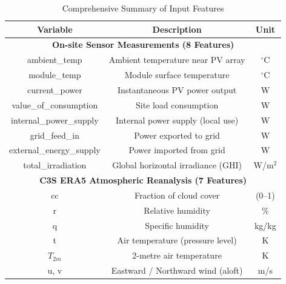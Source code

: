\documentclass[conference]{IEEEtran}
\begin{document}
	\begin{table}[!hb]
		\centering
		\caption{Comprehensive Summary of Input Features}
		\label{tab:comprehensive_features}
		\setlength{\tabcolsep}{1pt}
		\begin{tabular}{|c|c|c|}
			\hline
			\textbf{Variable} & \textbf{Description} & \textbf{Unit} \\ \hline
			
			\multicolumn{3}{|c|}{\textbf{On-site Sensor Measurements (8 Features)}} \\ \hline
			ambient\_temp            & Ambient temperature near PV array                & $^\circ$C \\ \hline
			module\_temp             & Module surface temperature                       & $^\circ$C \\ \hline
			current\_power           & Instantaneous PV power output                    & W \\ \hline
			value\_of\_consumption   & Site load consumption                            & W \\ \hline
			internal\_power\_supply  & Internal power supply (local use)                & W \\ \hline
			grid\_feed\_in           & Power exported to grid                           & W \\ \hline
			external\_energy\_supply & Power imported from grid                         & W \\ \hline
			total\_irradiation       & Global horizontal irradiance (GHI)               & W/m$^{2}$ \\ \hline
			
			\multicolumn{3}{|c|}{\textbf{C3S ERA5 Atmospheric Reanalysis (7 Features)}} \\ \hline
			cc        & Fraction of cloud cover                              & (0--1) \\ \hline
			r         & Relative humidity                                    & \% \\ \hline
			q         & Specific humidity                                    & kg/kg \\ \hline
			t         & Air temperature (pressure level)                     & K \\ \hline
			$T_{2m}$  & 2-metre air temperature                              & K \\ \hline
			u, v      & Eastward / Northward wind (aloft)                    & m/s \\ \hline
			

\end{tabular}
\end{table}
\end{document}
